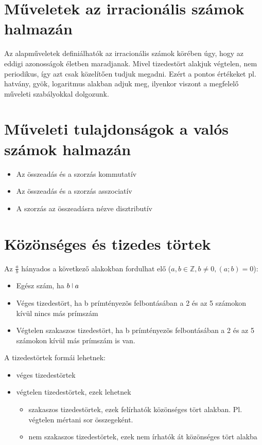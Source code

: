 \documentclass[twoside,12pt]{report}
\theoremstyle{definition}
\begin{document}
\section{Műveletek az irracionális számok halmazán}
	Az alapműveletek definiálhatók az irracionális számok körében úgy, hogy az eddigi azonosságok életben maradjanak. Mivel tizedestört alakjuk végtelen, nem periodikus, így azt csak közelítően tudjuk megadni. Ezért a pontos értékeket pl. hatvány, gyök, logaritmus alakban adjuk meg, ilyenkor	viszont a megfelelő műveleti szabályokkal dolgozunk.
\section{Műveleti tulajdonságok a valós számok halmazán}
	\begin{itemize}
		\item Az összeadás és a szorzás kommutatív
		\item Az összeadás és a szorzás asszociatív
		\item A szorzás az összeadásra nézve disztributív
	\end{itemize}
\section{Közönséges és tizedes törtek}
	Az $\frac{a}{b}$ hányados a következő alakokban fordulhat elő ($a,b\in\mathbb{Z},b\ne0, (a;b)=0$):
	\begin{itemize}
		\item Egész szám, ha $b\ \vline\ a$
		\item Véges tizedestört, ha b prímtényezõs felbontásában a 2 és az 5 számokon kívül nincs más prímszám
		\item Végtelen szakaszos tizedestört, ha b prímtényezõs felbontásában a 2 és az 5 számokon kívül	más prímszám is van.
	\end{itemize}
	A tizedestörtek formái lehetnek:
	\begin{itemize}
		\item véges tizedestörtek
		\item végtelen tizedestörtek, ezek lehetnek
			\begin{itemize}
				\item szakaszos tizedestörtek, ezek felírhatók közönséges tört alakban. Pl. végtelen mértani sor összegeként.
				\item nem szakaszos tizedestörtek, ezek nem írhatók át közönséges tört alakba
			\end{itemize}
	\end{itemize}
\end{document}
